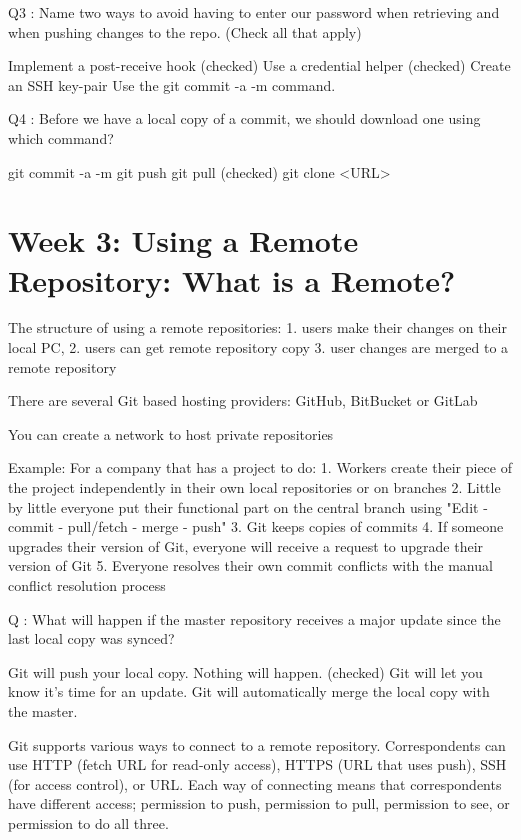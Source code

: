 \documentclass[11pt, onecolumn]{article}
\begin{document}
Q3 : Name two ways to avoid having to enter our password when retrieving and when pushing changes to the repo. (Check all that apply)

Implement a post-receive hook
(checked) Use a credential helper
(checked) Create an SSH key-pair
Use the git commit -a -m command.


Q4 : Before we have a local copy of a commit, we should download one using which command? 

git commit -a -m
git push
git pull
(checked) git clone <URL>


\section{Week 3: Using a Remote Repository: What is a Remote?}

The structure of using a remote repositories:
1. users make their changes on their local PC,
2. users can get remote repository copy
3. user changes are merged to a remote repository

There are several Git based hosting providers: GitHub, BitBucket or GitLab

You can create a network to host private repositories

Example: 
For a company that has a project to do:
1. Workers create their piece of the project independently in their own local repositories or on branches
2. Little by little everyone put their functional part on the central branch using "Edit - commit - pull/fetch - merge - push"
3. Git keeps copies of commits
4. If someone upgrades their version of Git, everyone will receive a request to upgrade their version of Git
5. Everyone resolves their own commit conflicts with the manual conflict resolution process



Q : What will happen if the master repository receives a major update since the last local copy was synced?

Git will push your local copy.
Nothing will happen.
(checked) Git will let you know it's time for an update.
Git will automatically merge the local copy with the master.


Git supports various ways to connect to a remote repository. Correspondents can use HTTP (fetch URL for read-only access), HTTPS (URL that uses push), SSH (for access control), or URL. Each way of connecting means that correspondents have different access; permission to push, permission to pull, permission to see, or permission to do all three.
\end{document}
